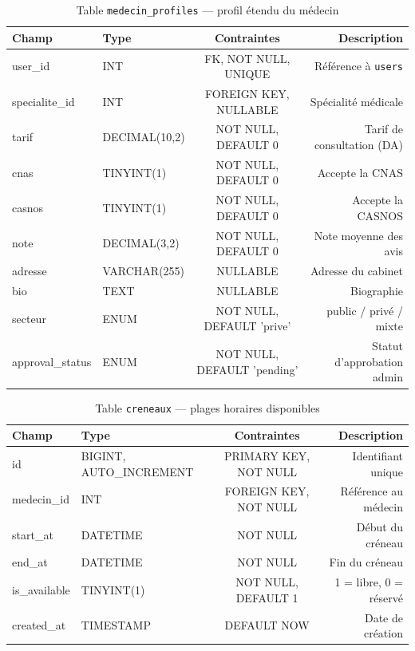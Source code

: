 \documentclass[12pt,a4paper]{report}
\newcommand{\tblheader}{%
  \hline
  \textbf{Champ} & \textbf{Type} & \textbf{Contraintes} & \textbf{Description} \\
  \hline\hline
}
\begin{document}
\begin{table}[H]
\centering
\caption{Table \texttt{medecin\_profiles} --- profil \'etendu du m\'edecin}
\label{tab:medecin_profiles}
\begin{tabular}{ABCD}
  \tblheader
  user\_id          & INT            & FK, NOT NULL, UNIQUE        & R\'ef\'erence \`a \texttt{users} \\ \hline
  specialite\_id    & INT            & FOREIGN KEY, NULLABLE       & Sp\'ecialit\'e m\'edicale \\ \hline
  tarif             & DECIMAL(10,2)  & NOT NULL, DEFAULT 0         & Tarif de consultation (DA) \\ \hline
  cnas              & TINYINT(1)     & NOT NULL, DEFAULT 0         & Accepte la CNAS \\ \hline
  casnos            & TINYINT(1)     & NOT NULL, DEFAULT 0         & Accepte la CASNOS \\ \hline
  note              & DECIMAL(3,2)   & NOT NULL, DEFAULT 0         & Note moyenne des avis \\ \hline
  adresse           & VARCHAR(255)   & NULLABLE                    & Adresse du cabinet \\ \hline
  bio               & TEXT           & NULLABLE                    & Biographie \\ \hline
  secteur           & ENUM           & NOT NULL, DEFAULT 'prive'   & public / priv\'e / mixte \\ \hline
  approval\_status  & ENUM           & NOT NULL, DEFAULT 'pending' & Statut d'approbation admin \\ \hline
\end{tabular}
\end{table}

\begin{table}[H]
\centering
\caption{Table \texttt{creneaux} --- plages horaires disponibles}
\begin{tabular}{ABCD}
  \tblheader
  id            & BIGINT, AUTO\_INCREMENT & PRIMARY KEY, NOT NULL & Identifiant unique \\ \hline
  medecin\_id   & INT                     & FOREIGN KEY, NOT NULL & R\'ef\'erence au m\'edecin \\ \hline
  start\_at     & DATETIME                & NOT NULL              & D\'ebut du cr\'eneau \\ \hline
  end\_at       & DATETIME                & NOT NULL              & Fin du cr\'eneau \\ \hline
  is\_available & TINYINT(1)              & NOT NULL, DEFAULT 1   & 1 = libre, 0 = r\'eserv\'e \\ \hline
  created\_at   & TIMESTAMP               & DEFAULT NOW           & Date de cr\'eation \\ \hline
\end{tabular}
\end{table}
\end{document}
